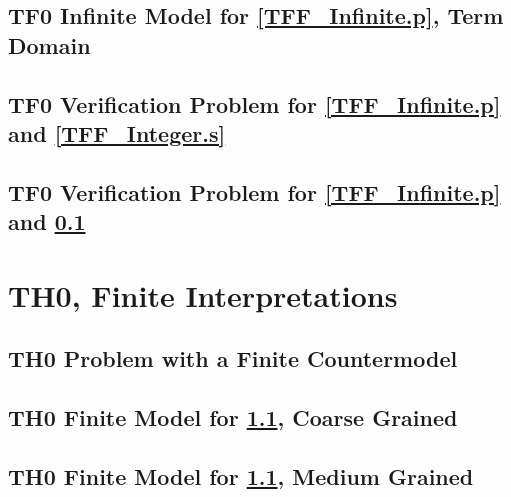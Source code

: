 \documentclass{easychair}
\begin{document}
\newpage
\subsection{TF0 Infinite Model for \ref{TFF_Infinite.p}, Term Domain}
\label{TFF_Peano.s}
\begin{small}

\end{small}

\newpage
\subsection{TF0 Verification Problem for \ref{TFF_Infinite.p} and \ref{TFF_Integer.s}}
\label{TFF_Integer.s.p}
\begin{small}

\end{small}

\newpage
\subsection{TF0 Verification Problem for \ref{TFF_Infinite.p} and \ref{TFF_Peano.s}}
\label{TFF_Peano.s.p}
\begin{small}

\end{small}

\newpage
\section{TH0, Finite Interpretations}
\label{TH0Finite}

\subsection{TH0 Problem with a Finite Countermodel}
\label{THF_Finite.p}
\begin{small}

\end{small}

\newpage
\subsection{TH0 Finite Model for \ref{THF_Finite.p}, Coarse Grained}
\label{THF_Finite.s}
\begin{small}

\end{small}

\newpage
\subsection{TH0 Finite Model for \ref{THF_Finite.p}, Medium Grained}
\label{THF_Finite_Medium.s}
\begin{small}

\end{small}
\end{document}

